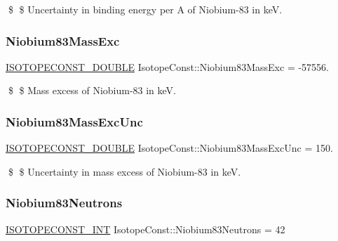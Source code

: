 \$ \$ Uncertainty in binding energy per A of Niobium-\/83 in keV. \mbox{\label{group___isotope_const-_niobium-_nb83_ga6de0b7dfcbdbaccf9eb55522757f1332}} 
\subsubsection{\texorpdfstring{Niobium83\+Mass\+Exc}{Niobium83MassExc}}
{\footnotesize\ttfamily \mbox{\hyperlink{group___isotope_const-_macros_ga8f45a7272ce02c0b4c65c44636ed719a}{I\+S\+O\+T\+O\+P\+E\+C\+O\+N\+S\+T\+\_\+\+D\+O\+U\+B\+LE}} Isotope\+Const\+::\+Niobium83\+Mass\+Exc = -\/57556.}

\$ \$ Mass excess of Niobium-\/83 in keV. \mbox{\label{group___isotope_const-_niobium-_nb83_gabda7f108713d8cec57a9faac254916d7}} 
\subsubsection{\texorpdfstring{Niobium83\+Mass\+Exc\+Unc}{Niobium83MassExcUnc}}
{\footnotesize\ttfamily \mbox{\hyperlink{group___isotope_const-_macros_ga8f45a7272ce02c0b4c65c44636ed719a}{I\+S\+O\+T\+O\+P\+E\+C\+O\+N\+S\+T\+\_\+\+D\+O\+U\+B\+LE}} Isotope\+Const\+::\+Niobium83\+Mass\+Exc\+Unc = 150.}

\$ \$ Uncertainty in mass excess of Niobium-\/83 in keV. \mbox{\label{group___isotope_const-_niobium-_nb83_ga41f71b699997762d50b08ca9a2978941}} 
\subsubsection{\texorpdfstring{Niobium83\+Neutrons}{Niobium83Neutrons}}
{\footnotesize\ttfamily \mbox{\hyperlink{group___isotope_const-_macros_ga5f18360b3e99483a35c32d789e62621c}{I\+S\+O\+T\+O\+P\+E\+C\+O\+N\+S\+T\+\_\+\+I\+NT}} Isotope\+Const\+::\+Niobium83\+Neutrons = 42}

